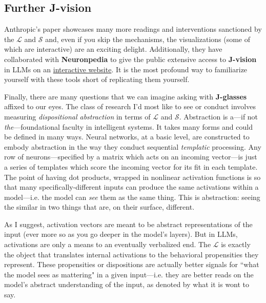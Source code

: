 \documentclass{article}
\newcommand{\jlens}{\mathscr{L}}
\newcommand{\jspace}{\mathscr{S}}
\begin{document}
\subsection{Further J-vision}

Anthropic's paper showcases many more readings and interventions sanctioned by the \(\jlens\) and \(\jspace\) and, even if you skip the mechanisms, the visualizations (some of which are interactive) are an exciting delight. Additionally, they have collaborated with \textbf{Neuronpedia} to give the public extensive access to \textbf{J-vision} in LLMs on an \href{https://www.neuronpedia.org/qwen3.6-27b/jlens?shareId=cmr1qav5a0008pt2xhsvp0scq}{interactive website}. It is the most profound way to familiarize yourself with these tools short of replicating them yourself.


Finally, there are many questions that we can imagine asking with \textbf{J-glasses} affixed to our eyes. The class of research I'd most like to see or conduct involves measuring \textit{dispositional abstraction} in terms of \(\jlens\) and \(\jspace\). Abstraction is a---if not \textit{the}---foundational faculty in intelligent systems. It takes many forms and could be defined in many ways. Neural networks, at a basic level, are constructed to embody abstraction in the way they conduct sequential \textit{templatic} processing. Any row of neurons---specified by a matrix which acts on an incoming vector---is just a series of templates which score the incoming vector for its fit in each template. The point of having dot products, wrapped in nonlinear activation functions is so that many specifically-different inputs can produce the same activations within a model---i.e. the model can \textit{see} them as the same thing. This is abstraction: seeing the similar in two things that are, on their surface, different. 

As I suggest, activation vectors are meant to be abstract representations of the input (ever more so as you go deeper in the model's layers). But in LLMs, activations are only a means to an eventually verbalized end. The \(\jlens\) is exactly the object that translates internal activations to the behavioral propensities they represent. These propensities or dispositions are actually better signals for ``what the model sees as mattering" in a given input---i.e. they are better reads on the model's abstract understanding of the input, as denoted by what it is wont to say. 
\end{document}

